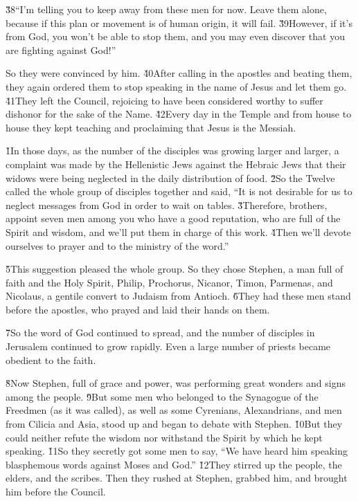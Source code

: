 \v{38}``I'm telling you to keep away from these men for now. Leave them alone, because if this plan or movement is of human origin, it will fail. \v{39}However, if it's from God, you won't be able to stop them, and you may even discover that you are fighting against God!''

So they were convinced by him. \v{40}After calling in the apostles and beating them, they again ordered them to stop speaking in the name of Jesus and let them go. \v{41}They left the Council, rejoicing to have been considered worthy to suffer dishonor for the sake of the Name. \v{42}Every day in the Temple and from house to house they kept teaching and proclaiming that Jesus is the Messiah.

\v{1}In those days, as the number of the disciples was growing larger and larger, a complaint was made by the Hellenistic Jews against the Hebraic Jews that their widows were being neglected in the daily distribution of food. \v{2}So the Twelve called the whole group of disciples together and said, ``It is not desirable for us to neglect messages from God in order to wait on tables. \v{3}Therefore, brothers, appoint seven men among you who have a good reputation, who are full of the Spirit and wisdom, and we'll put them in charge of this work. \v{4}Then we'll devote ourselves to prayer and to the ministry of the word.''

\v{5}This suggestion pleased the whole group. So they chose Stephen, a man full of faith and the Holy Spirit, Philip, Prochorus, Nicanor, Timon, Parmenas, and Nicolaus, a gentile convert to Judaism from Antioch. \v{6}They had these men stand before the apostles, who prayed and laid their hands on them.

\v{7}So the word of God continued to spread, and the number of disciples in Jerusalem continued to grow rapidly. Even a large number of priests became obedient to the faith.

\v{8}Now Stephen, full of grace and power, was performing great wonders and signs among the people. \v{9}But some men who belonged to the Synagogue of the Freedmen (as it was called), as well as some Cyrenians, Alexandrians, and men from Cilicia and Asia, stood up and began to debate with Stephen. \v{10}But they could neither refute the wisdom nor withstand the Spirit by which he kept speaking. \v{11}So they secretly got some men to say, ``We have heard him speaking blasphemous words against Moses and God.'' \v{12}They stirred up the people, the elders, and the scribes. Then they rushed at Stephen, grabbed him, and brought him before the Council.

